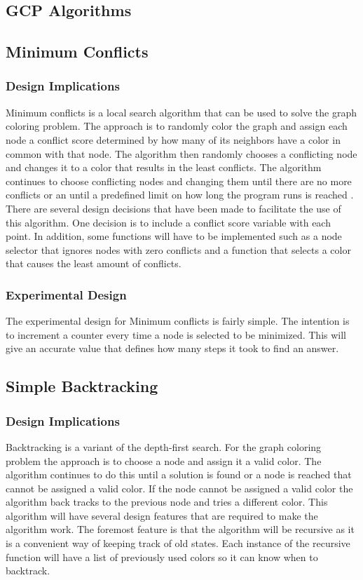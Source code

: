 \documentclass{article}
\begin{document}
\begin{multicols}{2}
\section{GCP Algorithms}
\label{algorithms}

\subsection{Minimum Conflicts}
\subsubsection{Design Implications}
Minimum conflicts is a local search algorithm that can be used to solve the graph coloring problem. The approach is to randomly color the graph and assign each node a conflict score determined by how many of its neighbors have a color in common with that node. The algorithm then randomly chooses a conflicting node and changes it to a color that results in the least conflicts. The algorithm continues to choose conflicting nodes and changing them until there are no more conflicts or an until a predefined limit on how long the program runs is reached \cite{ai}. 
There are several design decisions that have been made to facilitate the use of this algorithm. One decision is to include a conflict score variable with each point. In addition, some functions will have to be implemented such as a node selector that ignores nodes with zero conflicts and a function that selects a color that causes the least amount of conflicts.
\subsubsection{Experimental Design}
The experimental design for Minimum conflicts is fairly simple. The intention is to increment a counter every time a node is selected to be minimized. This will give an accurate value that defines how many steps it took to find an answer.

\subsection{Simple Backtracking}
\subsubsection{Design Implications}
Backtracking is a variant of the depth-first search. For the graph coloring problem the approach is to choose a node and assign it a valid color. The algorithm continues to do this until a solution is found or a node is reached that cannot be assigned a valid color. If the node cannot be assigned a valid color the algorithm back tracks to the previous node and tries a different color.  
This algorithm will have several design features that are required to make the algorithm work. The foremost feature is that the algorithm will be recursive as it is a convenient way of keeping track of old states. Each instance of the recursive function will have a list of previously used colors so it can know when to backtrack. 

\end{multicols}
\end{document}
